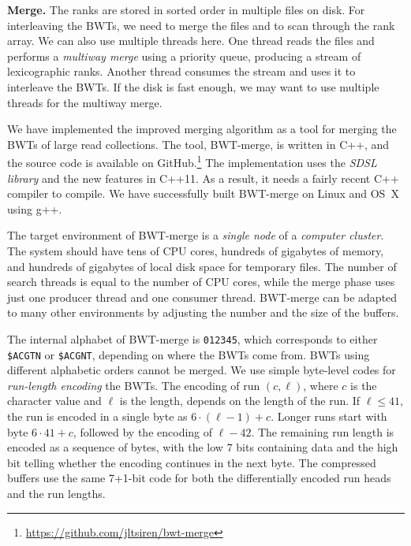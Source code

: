 \documentclass[smallabstract,smallcaptions]{dccpaper}
\newcommand{\BWT}{\textsf{BWT}}
\newcommand{\BWTmerge}{\textsf{BWT\nobreakdash-merge}}
\begin{document}
\smallbreak\noindent\textbf{Merge.} The ranks are stored in sorted order in multiple files on disk. For interleaving the \BWT{}s, we need to merge the files and to scan through the rank array. We can also use multiple threads here. One thread reads the files and performs a \emph{multiway merge} using a priority queue, producing a stream of lexicographic ranks. Another thread consumes the stream and uses it to interleave the \BWT{}s. If the disk is fast enough, we may want to use multiple threads for the multiway merge.



We have implemented the improved merging algorithm as a tool for merging the \BWT{}s of large read collections. The tool, \BWTmerge{}, is written in C++, and the source code is available on GitHub.\footnote{\url{https://github.com/jltsiren/bwt-merge}} The implementation uses the \emph{SDSL library} \cite{Gog2014b} and the new features in C++11. As a result, it needs a fairly recent C++ compiler to compile. We have successfully built \BWTmerge{} on Linux and OS~X using g++.

The target environment of \BWTmerge{} is a \emph{single node} of a \emph{computer cluster}. The system should have tens of CPU cores, hundreds of gigabytes of memory, and hundreds of gigabytes of local disk space for temporary files. The number of search threads is equal to the number of CPU cores, while the merge phase uses just one producer thread and one consumer thread. \BWTmerge{} can be adapted to many other environments by adjusting the number and the size of the buffers.

The internal alphabet of \BWTmerge{} is \texttt{012345}, which corresponds to either \texttt{\$ACGTN} or \texttt{\$ACGNT}, depending on where the \BWT{}s come from. \BWT{}s using different alphabetic orders cannot be merged. We use simple byte-level codes for \emph{run-length encoding} the \BWT{}s. The encoding of run $(c, \ell)$, where $c$ is the character value and $\ell$ is the length, depends on the length of the run. If $\ell \le 41$, the run is encoded in a single byte as $6 \cdot (\ell-1) + c$. Longer runs start with byte $6 \cdot 41 + c$, followed by the encoding of $\ell-42$. The remaining run length is encoded as a sequence of bytes, with the low 7 bits containing data and the high bit telling whether the encoding continues in the next byte. The compressed buffers use the same 7+1\nobreakdash-bit code for both the differentially encoded run heads and the run lengths.
\end{document}
